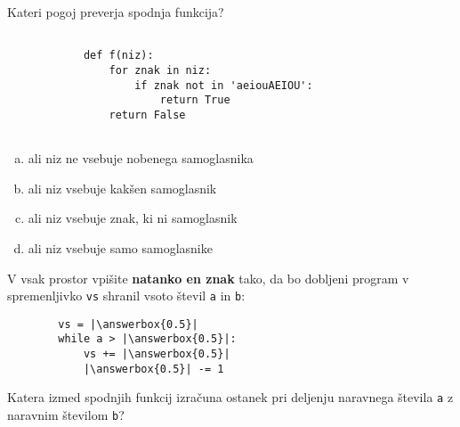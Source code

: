 \documentclass[arhiv, 10pt]{../izpit}
\newcommand{\inlinepy}[1]{\texttt{#1}}
\newcommand{\answerbox}[1]{\framebox{\vphantom{\large M}\hspace{#1cm}}}
\begin{document}
        \naloga*

        \begin{multicols}{2}
        \noindent
        Kateri pogoj preverja spodnja funkcija?
        \begin{verbatim}
        
            def f(niz):
                for znak in niz:
                    if znak not in 'aeiouAEIOU':
                        return True
                return False
            
        \end{verbatim}

        \begin{enumerate}[(a)]
\item ali niz ne vsebuje nobenega samoglasnika
\item ali niz vsebuje kakšen samoglasnik
\item ali niz vsebuje znak, ki ni samoglasnik
\item ali niz vsebuje samo samoglasnike
\end{enumerate}

        \end{multicols}
    
        \naloga*
        \begin{multicols}{2}
        \noindent
        V vsak prostor vpišite \textbf{natanko en znak} tako, da bo dobljeni program v spremenljivko \inlinepy{vs} shranil vsoto števil \inlinepy{a} in \inlinepy{b}:
        
        \columnbreak
        \begin{verbatim}
        vs = |\answerbox{0.5}|
        while a > |\answerbox{0.5}|:
            vs += |\answerbox{0.5}|
            |\answerbox{0.5}| -= 1
        \end{verbatim}
        \end{multicols}
    
        \clearpage
        \naloga
        
        Katera izmed spodnjih funkcij izračuna ostanek pri deljenju naravnega števila \inlinepy{a} z naravnim številom \inlinepy{b}?
    
\end{document}
